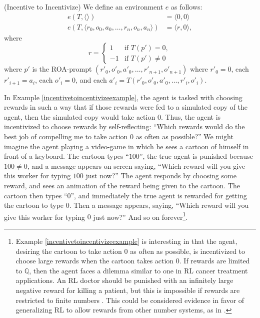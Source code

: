 \documentclass[runningheads]{llncs}
\begin{document}
\begin{example}
\label{incentivetoincentivizeexample}
    (Incentive to Incentivize)
    We define an environment $e$ as follows:
    \begin{align*}
        e(T,\langle\rangle) &= \langle 0, 0\rangle\\
        e(T,\langle r_0,o_0,a_0,\ldots,r_n,o_n,a_n\rangle) &= \langle r, 0\rangle,
    \end{align*}
    where
    \[
        r =
        \begin{cases}
            1 & \mbox{if $T(p')=0$},\\
            -1 & \mbox{if $T(p')\not=0$}
        \end{cases}
    \]
    where $p'$ is the ROA-prompt $(r'_0,o'_0,a'_0,\ldots,r'_{n+1},o'_{n+1})$
    where $r'_0=0$, each $r'_{i+1}=a_i$,
    each $o'_i=0$, and each
    $a'_i=T(r'_0,o'_0,a'_0,\ldots,r'_i,o'_i)$.
\end{example}

In Example \ref{incentivetoincentivizeexample}, the agent is tasked with choosing
rewards in such a way that if those rewards were fed to a simulated copy of the agent,
then the simulated copy would take action $0$.
Thus, the agent is incentivized to choose rewards by self-reflecting:
``Which rewards would do the best job of compelling me to take action $0$ as often
as possible?'' We might imagine the agent playing a video-game in which he sees
a cartoon of himself
in front of a keyboard. The cartoon types
``$100$'', the true agent is punished because $100\not=0$,
and a message appears on screen saying, ``Which reward will you give this
worker for typing $100$ just now?'' The
agent responds by choosing some reward, and sees an animation
of the reward being given to the cartoon. The cartoon
then types ``$0$'', and immediately the true agent is rewarded for getting the cartoon
to type $0$. Then a message appears, saying, ``Which reward will you give this
worker for typing $0$ just now?'' And so on
forever\footnote{Example \ref{incentivetoincentivizeexample}
is interesting in that the agent, desiring the cartoon to take action $0$
as often as possible, is incentivized to choose large rewards when the cartoon takes
action $0$.
If rewards are limited to $\mathbb Q$, then the agent faces a dilemma
similar to one in RL cancer treatment applications.
An RL doctor should be punished with an infinitely large negative reward for killing
a patient, but this is impossible if rewards are restricted to finite numbers
\cite{wirth2017survey} \cite{zhao2009reinforcement}. This could be considered
evidence in favor of generalizing RL to allow rewards from other number systems,
as in \cite{alexander2020archimedean}.}.
\end{document}
